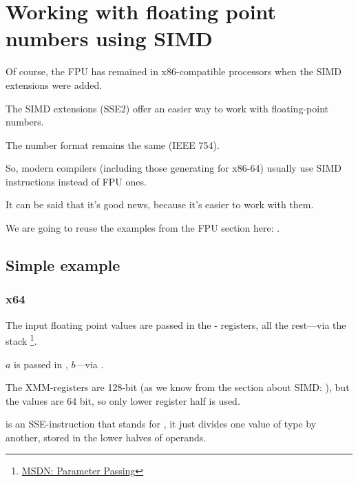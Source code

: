 \section{Working with floating point numbers using SIMD}

\label{floating_SIMD}

Of course, the \ac{FPU} has remained in x86-compatible processors when the \ac{SIMD} extensions were added.

The \ac{SIMD} extensions (SSE2) offer an easier way to work with floating-point numbers.

The number format remains the same (IEEE 754).

So, modern compilers (including those generating
for x86-64) usually use \ac{SIMD} instructions instead of FPU ones.

It can be said that it's good news, because it's easier to work with them.

We are going to reuse the examples from the FPU section here: .

\subsection{Simple example}



\subsubsection{x64}



The input floating point values are passed in the - registers,
all the rest---via the stack
\footnote{\href{http://go.yurichev.com/17263}{MSDN: Parameter Passing}}.

$a$ is passed in , $b$---via .

The XMM-registers are 128-bit (as we know from the section about \ac{SIMD}: ), 
but the \Tdouble values are 64 bit, so only lower register half is used.

 is an SSE-instruction that stands for 
, 
it just divides
one value of type \Tdouble by another, stored in the lower halves of operands.


